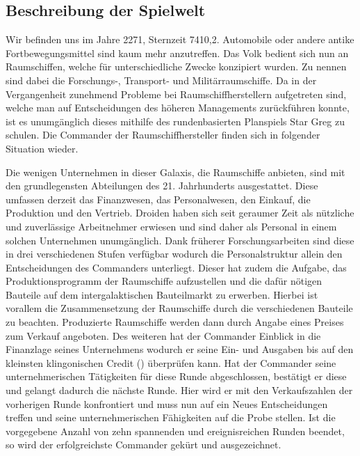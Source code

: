 \subsection{Beschreibung der Spielwelt}
\label{sec:spielwelt-szenario-spielwelt}

Wir befinden uns im Jahre 2271, Sternzeit 7410,2. Automobile oder andere antike Fortbewegungsmittel sind kaum mehr anzutreffen. Das Volk bedient sich nun an Raumschiffen, welche für unterschiedliche Zwecke konzipiert wurden. Zu nennen sind dabei die Forschungs-, Transport- und Militärraumschiffe. Da in der Vergangenheit zunehmend Probleme bei Raumschiffherstellern aufgetreten sind, welche man auf Entscheidungen des höheren Managements zurückführen konnte, ist es unumgänglich dieses mithilfe des rundenbasierten Planspiels Star Greg zu schulen. Die Commander der Raumschiffhersteller finden sich in folgender Situation wieder.

Die wenigen Unternehmen in dieser Galaxis, die Raumschiffe anbieten, sind mit den grundlegensten Abteilungen des 21. Jahrhunderts ausgestattet. Diese umfassen derzeit das Finanzwesen, das Personalwesen, den Einkauf, die Produktion und den Vertrieb. Droiden haben sich seit geraumer Zeit als nützliche und zuverlässige Arbeitnehmer erwiesen und sind daher als Personal in einem solchen Unternehmen unumgänglich. Dank früherer Forschungsarbeiten sind diese in drei verschiedenen Stufen verfügbar wodurch die Personalstruktur allein den Entscheidungen des Commanders unterliegt. Dieser hat zudem die Aufgabe, das Produktionsprogramm der Raumschiffe aufzustellen und die dafür nötigen Bauteile auf dem intergalaktischen Bauteilmarkt zu erwerben. Hierbei ist vorallem die Zusammensetzung der Raumschiffe durch die verschiedenen Bauteile zu beachten. Produzierte Raumschiffe werden dann durch Angabe eines Preises zum Verkauf angeboten. Des weiteren hat der Commander Einblick in die Finanzlage seines Unternehmens wodurch er seine Ein- und Ausgaben bis auf den kleinsten klingonischen Credit (\curr) überprüfen kann. Hat der Commander seine unternehmerischen Tätigkeiten für diese Runde abgeschlossen, bestätigt er diese und gelangt dadurch die nächste Runde. Hier wird er mit den Verkaufszahlen der vorherigen Runde konfrontiert und muss nun auf ein Neues Entscheidungen treffen und seine unternehmerischen Fähigkeiten auf die Probe stellen. Ist die vorgegebene Anzahl von zehn spannenden und ereignisreichen Runden beendet, so wird der erfolgreichste Commander gekürt und ausgezeichnet.

\autorende{}